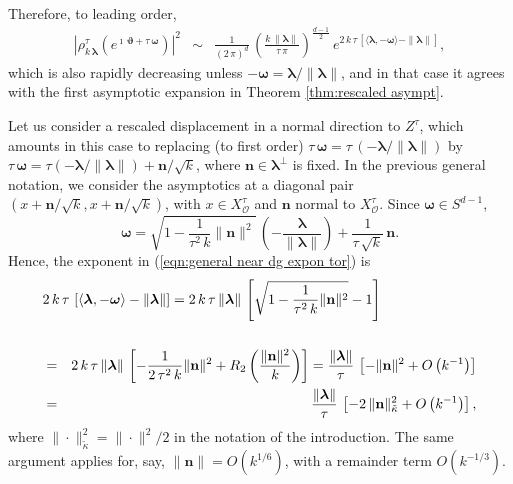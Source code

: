 \documentclass[12pt,a4paper]{article}
\theoremstyle{plain}
\theoremstyle{definition}
\begin{document}
Therefore, to leading order,
\begin{eqnarray}
\label{eqn:general near dg expon tor}
\left| \rho^\tau_{k\,\boldsymbol{\lambda}}
\left( e^{\imath\,\boldsymbol{\vartheta}+\tau\,\boldsymbol{\omega}}   \right)   \right|^2   
&\sim&\frac{1}{(2\,\pi)^{d}}\,
\left(\frac{k\,\|\boldsymbol{\lambda}\|}{\tau\,\pi}\right)
^{\frac{d-1}{2}}\,
e^{2\,k\,\tau\,\left[\langle
\boldsymbol{\lambda},-\boldsymbol{\omega}
\rangle-\|\boldsymbol{\lambda}\|\right]
},
\end{eqnarray}
which is also rapidly decreasing unless 
$-\boldsymbol{\omega}=\boldsymbol{\lambda}/\|\boldsymbol{\lambda}\|$,
and in that case it agrees 
with the first asymptotic expansion in
Theorem \ref{thm:rescaled asympt}.

Let us consider a rescaled displacement in a normal direction
to $Z^\tau$, which amounts in this case to replacing
(to first order) $\tau\,\boldsymbol{\omega}=\tau\,(
-\boldsymbol{\lambda}/\|\boldsymbol{\lambda}\|)$ by $\tau\,\boldsymbol{\omega}=\tau(-\boldsymbol{\lambda}/\|\boldsymbol{\lambda}\|)+\mathbf{n}/\sqrt{k}$, where $\mathbf{n}\in \boldsymbol{\lambda}^\perp$
is fixed.
In the previous general notation, 
we consider the asymptotics at a diagonal pair
$(x+\mathbf{n}/\sqrt{k},x+\mathbf{n}/\sqrt{k})$, with
$x\in X^\tau_{\mathcal{O}}$ and $\mathbf{n}$ normal to $X^\tau_{\mathcal{O}}$.
Since $\boldsymbol{\omega}\in S^{d-1}$, 
$$
\boldsymbol{\omega}=\sqrt{1-\frac{1}{\tau^2\,k}\|\mathbf{n}\|^2}\,
\left(-\frac{\boldsymbol{\lambda}}{\|\boldsymbol{\lambda}\|}\right)+
\frac{1}{\tau\,\sqrt{k}}\,\mathbf{n}.
$$
Hence, the exponent in (\ref{eqn:general near dg expon tor})
is
\begin{eqnarray*}
\lefteqn{ 
2\,k\,\tau\,\left[\langle
\boldsymbol{\lambda},-\boldsymbol{\omega}
\rangle-\|\boldsymbol{\lambda}\|\right]  
=2\,k\,\tau\,\|\boldsymbol{\lambda}\|\,\left[
\sqrt{1-\frac{1}{\tau^2\,k}\|\mathbf{n}\|^2}-1\right] }\\\\
&=&2\,k\,\tau\,\|\boldsymbol{\lambda}\|\,
\left[
-\frac{1}{2\,\tau^2\,k}\|\mathbf{n}\|^2+R_2\left(\frac{\|\mathbf{n}\|^2}{k}\right)\right] 
=\frac{\|\boldsymbol{\lambda}\|}{\tau}\,\left[
-\|\mathbf{n}\|^2+O\left(k^{-1}\right)
\right]\\
&=&\frac{\|\boldsymbol{\lambda}\|}{\tau}\,\left[
-2\,\|\mathbf{n}\|_{\tilde{\kappa}}^2+O\left(k^{-1}\right)
\right],
\end{eqnarray*}
where $\|\cdot\|^2_{\tilde{\kappa}}=\|\cdot\|^2/2$ in the notation of the 
introduction. The same argument applies for, say,
$\|\mathbf{n}\|=O\left(k^{1/6}\right)$, with a remainder
term $O\left(k^{-1/3}\right)$.
\end{document}
